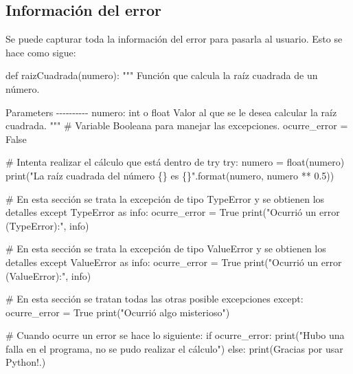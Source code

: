 \documentclass[
  letterpaper,
  DIV=11,
  numbers=noendperiod]{scrreprt}
\newenvironment{Shaded}{\begin{snugshade}}{\end{snugshade}}
\newcommand{\BuiltInTok}[1]{\textcolor[rgb]{0.00,0.23,0.31}{#1}}
\newcommand{\CommentTok}[1]{\textcolor[rgb]{0.37,0.37,0.37}{#1}}
\newcommand{\ControlFlowTok}[1]{\textcolor[rgb]{0.00,0.23,0.31}{#1}}
\newcommand{\FloatTok}[1]{\textcolor[rgb]{0.68,0.00,0.00}{#1}}
\newcommand{\ImportTok}[1]{\textcolor[rgb]{0.00,0.46,0.62}{#1}}
\newcommand{\KeywordTok}[1]{\textcolor[rgb]{0.00,0.23,0.31}{#1}}
\newcommand{\NormalTok}[1]{\textcolor[rgb]{0.00,0.23,0.31}{#1}}
\newcommand{\OperatorTok}[1]{\textcolor[rgb]{0.37,0.37,0.37}{#1}}
\newcommand{\PreprocessorTok}[1]{\textcolor[rgb]{0.68,0.00,0.00}{#1}}
\newcommand{\SpecialCharTok}[1]{\textcolor[rgb]{0.37,0.37,0.37}{#1}}
\newcommand{\StringTok}[1]{\textcolor[rgb]{0.13,0.47,0.30}{#1}}
\newcommand{\VariableTok}[1]{\textcolor[rgb]{0.07,0.07,0.07}{#1}}
\begin{document}
\subsection{Información del error}\label{informaciuxf3n-del-error}

Se puede capturar toda la información del error para pasarla al usuario.
Esto se hace como sigue:

\begin{Shaded}
\begin{Highlighting}[]
\KeywordTok{def}\NormalTok{ raizCuadrada(numero): }
    \CommentTok{"""}
\CommentTok{    Función que calcula la raíz cuadrada de un número.}

\CommentTok{    Parameters}
\CommentTok{    {-}{-}{-}{-}{-}{-}{-}{-}{-}{-}}
\CommentTok{    numero: int o float}
\CommentTok{    Valor al que se le desea calcular la raíz cuadrada.}
\CommentTok{    }
\CommentTok{    """}
    \CommentTok{\# Variable Booleana para manejar las excepciones.}
\NormalTok{    ocurre\_error }\OperatorTok{=} \VariableTok{False}
    
    \CommentTok{\# Intenta realizar el cálculo que está dentro de try}
    \ControlFlowTok{try}\NormalTok{:}
\NormalTok{        numero }\OperatorTok{=} \BuiltInTok{float}\NormalTok{(numero)}
        \BuiltInTok{print}\NormalTok{(}\StringTok{"La raíz cuadrada del número }\SpecialCharTok{\{\}}\StringTok{ es }\SpecialCharTok{\{\}}\StringTok{"}\NormalTok{.}\BuiltInTok{format}\NormalTok{(numero, numero }\OperatorTok{**} \FloatTok{0.5}\NormalTok{))}

    \CommentTok{\# En esta sección se trata la excepción de tipo TypeError y se obtienen los detalles  }
    \ControlFlowTok{except} \PreprocessorTok{TypeError} \ImportTok{as}\NormalTok{ info:}
\NormalTok{        ocurre\_error }\OperatorTok{=} \VariableTok{True}
        \BuiltInTok{print}\NormalTok{(}\StringTok{"Ocurrió un error (TypeError):"}\NormalTok{, info)}

    \CommentTok{\# En esta sección se trata la excepción de tipo ValueError y se obtienen los detalles  }
    \ControlFlowTok{except} \PreprocessorTok{ValueError} \ImportTok{as}\NormalTok{ info:}
\NormalTok{        ocurre\_error }\OperatorTok{=} \VariableTok{True}
        \BuiltInTok{print}\NormalTok{(}\StringTok{"Ocurrió un error (ValueError):"}\NormalTok{, info)}

    \CommentTok{\# En esta sección se tratan todas las otras posible excepciones}
    \ControlFlowTok{except}\NormalTok{:}
\NormalTok{        ocurre\_error }\OperatorTok{=} \VariableTok{True}
        \BuiltInTok{print}\NormalTok{(}\StringTok{"Ocurrió algo misterioso"}\NormalTok{)}

    \CommentTok{\# Cuando ocurre un error se hace lo siguiente:}
    \ControlFlowTok{if}\NormalTok{ ocurre\_error:}
        \BuiltInTok{print}\NormalTok{(}\StringTok{"Hubo una falla en el programa, no se pudo realizar el cálculo"}\NormalTok{)}
    \ControlFlowTok{else}\NormalTok{:}
        \BuiltInTok{print}\NormalTok{(}\StringTok{\textquotesingle{}Gracias por usar Python!.\textquotesingle{}}\NormalTok{)}
\end{Highlighting}
\end{Shaded}
\end{document}
